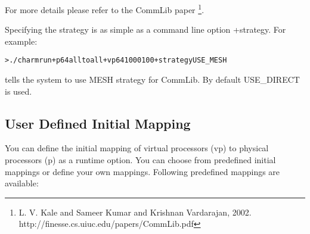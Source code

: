 \documentclass[10pt]{article}
\begin{document}
For more details please refer to the CommLib paper \footnote{L. V. Kale and 
Sameer Kumar and Krishnan Vardarajan, 2002. 
http://finesse.cs.uiuc.edu/papers/CommLib.pdf}. 

Specifying the strategy is as simple as a command line option +strategy. For
example:
\begin{alltt}
> ./charmrun +p64 alltoall +vp64 1000 100 +strategy USE\_MESH
\end{alltt}
tells the system to use MESH strategy for CommLib. By default USE\_DIRECT is
used.

\subsection{User Defined Initial Mapping}
                                                                                
You can define the initial mapping of virtual processors (vp) to physical 
processors (p) as a runtime option. You can choose from predefined initial 
mappings or define your own mappings. Following predefined mappings are 
available:
                                                                                
\end{document}
